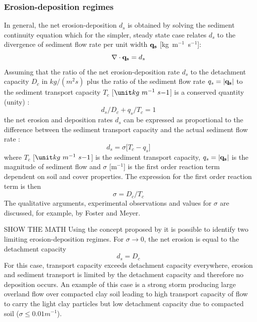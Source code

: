 \documentclass[gmd, manuscript]{copernicus}
\begin{document}
\subsubsection{Erosion-deposition regimes}

In general, the net erosion-deposition $d_s$ is obtained by solving the sediment continuity equation
which for the simpler, steady state case relates $d_s$ to the divergence 
of sediment flow rate per unit width ${\bf q_s}$ [\unit{kg~m}$^{-1}$~\unit{s}$^{-1}$]:
\begin{equation}
\label{eq:steady_sed}
\nabla\cdot {\bf q_s} = d_s 
\end{equation}
Assuming that the ratio of the net erosion-deposition rate $d_s$ to the detachment
 capacity $D_c$ in $kg/(m^2s)$ %
 plus the ratio of the sediment flow rate $q_s = |{\bf q_s}|$ 
to the sediment transport capacity $T_c$ [$\unit kg~m^{-1}~s{-1}$] is
 a conserved quantity (unity) \cite{fostermeyer72}:
\begin{equation}
\label{eq:foster_law}
d_s/D_c + q_s/T_c = 1
\end{equation}
the net erosion and deposition rates $d_s$ can be expressed as proportional to the difference between
the sediment transport capacity and the actual sediment flow rate \cite{fostermeyer72}:
\begin{equation}
\label{eq:sigma}
d_s =\sigma \bigl[ T_c - q_s\bigr]
\end{equation}
\noindent
where 
$T_c$ [$\unit kg~m^{-1}~s{-1}$] is the sediment transport capacity,
$q_s = |{\bf q_s}|$ is the magnitude of sediment flow and 
$\sigma$ [m$^{-1}$] is the first order reaction term
 dependent on soil and cover properties.
The expression for the first order reaction term  is then
\begin{equation}
\label{eq:sigma_Dc_Tc}
\sigma = D_c / T_c
\end{equation}
The qualitative arguments, experimental observations and values for $\sigma$ are discussed, for example, by Foster and Meyer\cite{fostermeyer72}.

SHOW THE MATH
Using the concept proposed by \cite{fostermeyer72} it is possible to identify two limiting erosion-deposition
regimes.
For $\sigma \to 0$, the net erosion is equal to the detachment capacity
\begin{equation}
\label{eq:detachment_limited}
 d_s = D_c
\end{equation}
For this case, transport capacity exceeds
detachment capacity everywhere, erosion and sediment transport is limited by the detachment
capacity and therefore no deposition occurs.
An example of this case is a strong storm producing large overland flow over compacted clay soil 
leading to high transport capacity of flow to carry the light clay particles
but low detachment capacity due to compacted soil ($\sigma \leq 0.01 \unit{m}^{-1}$).
\end{document}
